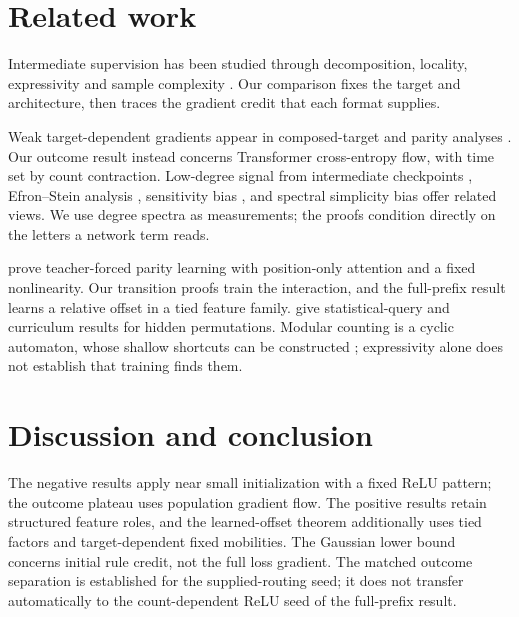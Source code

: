 \section{Related work}
\label{sec:related}

Intermediate supervision has been studied through decomposition, locality, expressivity and
sample complexity \citep{nye2021scratchpads,wies2023subtask,prystawski2023think,abbe2024globality,
feng2023towards,merrill2024expressive,malach2023autoregressive,hanneke2026samplecomplexityautoregressivereasoning,wen2024sparse}.
Our comparison fixes the target and architecture, then traces the gradient credit that each format supplies.

Weak target-dependent gradients appear in composed-target and parity analyses
\citep{shalevshwartz2017failures,abbe2021staircase,abbe2022mergedstaircase,abbe2023sgd,abbe2025parities}.
Our outcome result instead concerns Transformer cross-entropy flow, with time set by count contraction.
Low-degree signal from intermediate checkpoints \citep{panigrahi2025progressive}, Efron--Stein
analysis \citep{li2025noise}, sensitivity bias \citep{hahn2024sensitive}, and spectral simplicity
bias \citep{yang2019spectral} offer related views. We use degree spectra as measurements;
the proofs condition directly on the letters a network term reads.

\citet{kim2024parity} prove teacher-forced parity learning with position-only attention and a fixed
nonlinearity. Our transition proofs train the interaction, and the full-prefix result learns a
relative offset in a tied feature family. \citet{wang2025compositional} give statistical-query
and curriculum results for hidden permutations. Modular counting is a cyclic automaton,
whose shallow shortcuts can be constructed \citep{liu2023automata}; expressivity alone does
not establish that training finds them.

\section{Discussion and conclusion}
\label{sec:conclusion}
\label{sec:discussion}

The negative results apply near small initialization with a fixed ReLU pattern; the outcome
plateau uses population gradient flow. The positive results retain structured feature roles,
and the learned-offset theorem additionally uses tied factors and target-dependent fixed
mobilities. The Gaussian lower bound concerns initial rule credit, not the full loss gradient.
The matched outcome separation is established for the supplied-routing seed; it does not
transfer automatically to the count-dependent ReLU seed of the full-prefix result.

